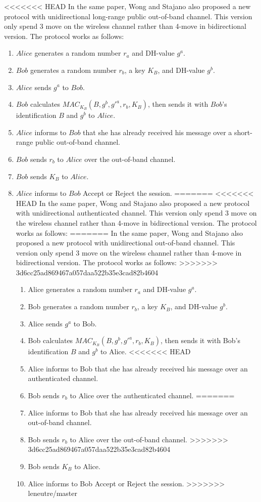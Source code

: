 \begin{enumerate}
<<<<<<< HEAD
In the same paper, Wong and Stajano also proposed a new protocol with unidirectional long-range public out-of-band channel. This version only spend 3 move on the wireless channel rather than 4-move in bidirectional version. The protocol works as follows:
\begin{enumerate}
\item $Alice$ generates a random number $r_a$ and DH-value $g^a$.
\item $Bob$ generates a random number $r_b$, a key $K_B$, and DH-value $g^b$.
\item $Alice$ sends $g^a$ to $Bob$. 
\item $Bob$ calculates $MAC_{K_B}(B,g^b,g'^a,r_b,K_B)$, then sends it with $Bob$'s identification $B$ and $g^b$ to $Alice$.
\item $Alice$ informs to $Bob$ that she has already received his message over a short-range public out-of-band channel. 
\item $Bob$ sends $r_b$ to $Alice$ over the out-of-band channel. 
\item $Bob$ sends $K_B$ to $Alice$. 
\item $Alice$ informs to $Bob$ Accept or Reject the session.
=======
<<<<<<< HEAD
In the same paper, Wong and Stajano also proposed a new protocol with unidirectional authenticated channel. This version only spend 3 move on the wireless channel rather than 4-move in bidirectional version. The protocol works as follows:
=======
In the same paper, Wong and Stajano also proposed a new protocol with unidirectional out-of-band channel. This version only spend 3 move on the wireless channel rather than 4-move in bidirectional version. The protocol works as follows:
>>>>>>> 3d6cc25ad869467a057daa522b35e3cad82b4604
\begin{enumerate}
\item Alice generates a random number $r_a$ and DH-value $g^a$.
\item Bob generates a random number $r_b$, a key $K_B$, and DH-value $g^b$.
\item Alice sends $g^a$ to Bob. 
\item Bob calculates $MAC_{K_B}(B,g^b,g'^a,r_b,K_B)$, then sends it with Bob's identification $B$ and $g^b$ to Alice.
<<<<<<< HEAD
\item Alice informs to Bob that she has already received his message over an authenticated channel. 
\item Bob sends $r_b$ to Alice over the authenticated channel. 
=======
\item Alice informs to Bob that she has already received his message over an out-of-band channel. 
\item Bob sends $r_b$ to Alice over the out-of-band channel. 
>>>>>>> 3d6cc25ad869467a057daa522b35e3cad82b4604
\item Bob sends $K_B$ to Alice. 
\item Alice informs to Bob Accept or Reject the session.
>>>>>>> leneutre/master
\end{enumerate}


\end{enumerate}
\end{enumerate}
